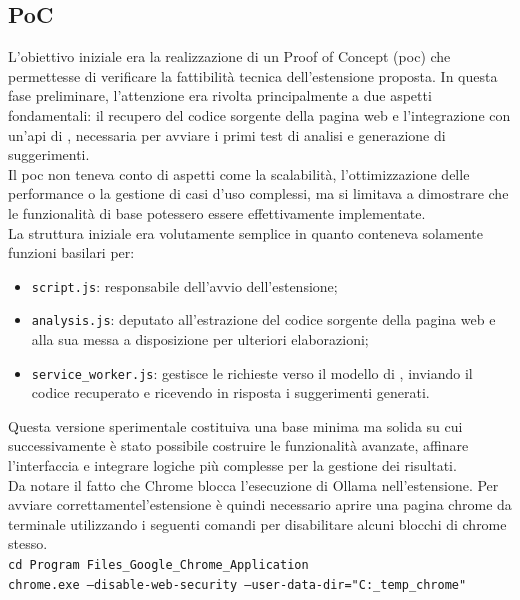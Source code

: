 \subsection{PoC}
\noindent L’obiettivo iniziale era la realizzazione di un Proof of Concept (\acrshort{poc}) che permettesse di verificare la fattibilità tecnica dell’estensione proposta. In questa fase preliminare, l’attenzione era rivolta principalmente a due aspetti fondamentali: il recupero del codice sorgente della pagina web e l’integrazione con un’\acrshort{api} di , necessaria per avviare i primi test di analisi e generazione di suggerimenti.\\
Il \acrshort{poc} non teneva conto di aspetti come la scalabilità, l’ottimizzazione delle performance o la gestione di casi d’uso complessi, ma si limitava a dimostrare che le funzionalità di base potessero essere effettivamente implementate. 
\\La struttura iniziale era volutamente semplice in quanto conteneva solamente funzioni basilari per:
\begin{itemize}
  \item \texttt{script.js}: responsabile dell’avvio dell’estensione;
  \item \texttt{analysis.js}: deputato all’estrazione del codice sorgente della pagina web e alla sua messa a disposizione per ulteriori elaborazioni;
  \item \texttt{service\_worker.js}: gestisce le richieste verso il modello di , inviando il codice recuperato e ricevendo in risposta i suggerimenti generati.
\end{itemize}

\noindent Questa versione sperimentale costituiva una base minima ma solida su cui successivamente è stato possibile costruire le funzionalità avanzate, affinare l’interfaccia e integrare logiche più complesse per la gestione dei risultati.\\

\noindent Da notare il fatto che Chrome blocca l'esecuzione di Ollama nell'estensione. Per avviare correttamentel'estensione è quindi necessario aprire una pagina chrome da terminale utilizzando i seguenti comandi per disabilitare alcuni blocchi di chrome stesso.\\
\texttt{cd Program Files\_Google\_Chrome\_Application\\
chrome.exe --disable-web-security --user-data-dir="C:\_temp\_chrome"}


